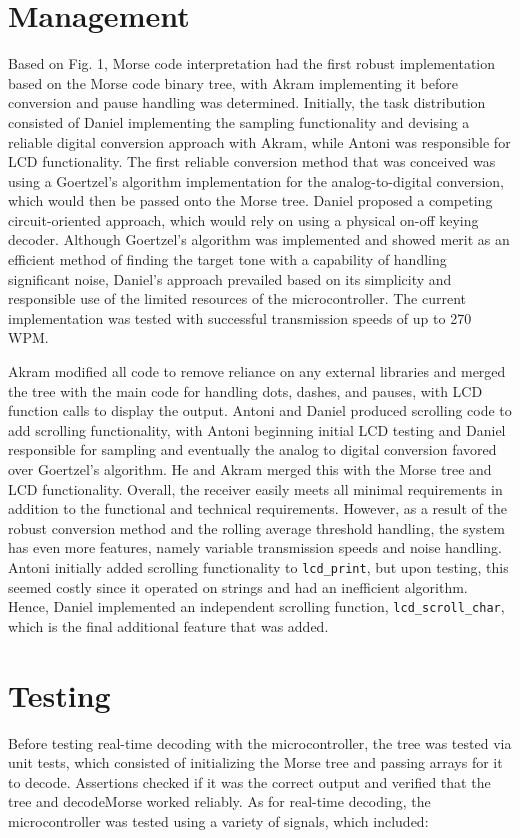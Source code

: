 \documentclass[head=13.6pt]{cce2014-design}
\begin{document}
\section{Management}
Based on Fig. 1, Morse code interpretation had the first robust implementation based on the Morse code binary tree, with Akram implementing it before conversion and pause handling was determined. Initially, the task distribution consisted of Daniel implementing the sampling functionality and devising a reliable digital conversion approach with Akram, while Antoni was responsible for LCD functionality. The first reliable conversion method that was conceived was using a Goertzel’s algorithm implementation for the analog-to-digital conversion, which would then be passed onto the Morse tree. Daniel proposed a competing circuit-oriented approach, which would rely on using a physical on-off keying decoder. Although Goertzel’s algorithm was implemented and showed merit as an efficient method of finding the target tone with a capability of handling significant noise, Daniel’s approach prevailed based on its simplicity and responsible use of the limited resources of the microcontroller. The current implementation was tested with successful transmission speeds of up to 270 WPM.

Akram modified all code to remove reliance on any external libraries and merged the tree with the main code for handling dots, dashes, and pauses, with LCD function calls to display the output. Antoni and Daniel produced scrolling code to add scrolling functionality, with Antoni beginning initial LCD testing and Daniel responsible for sampling and eventually the analog to digital conversion favored over Goertzel’s algorithm. He and Akram merged this with the Morse tree and LCD functionality. Overall, the receiver easily meets all minimal requirements in addition to the functional and technical requirements. However, as a result of the robust conversion method and the rolling average threshold handling, the system has even more features, namely variable transmission speeds and noise handling. Antoni initially added scrolling functionality to \texttt{lcd\_print}, but upon testing, this seemed costly since it operated on strings and had an inefficient algorithm. Hence, Daniel implemented an independent scrolling function, \texttt{lcd\_scroll\_char}, which is the final additional feature that was added.

\section{Testing}
Before testing real-time decoding with the microcontroller, the tree was tested via unit tests, which consisted of initializing the Morse tree and passing arrays for it to decode. Assertions checked if it was the correct output and verified that the tree and decodeMorse worked reliably. As for real-time decoding, the microcontroller was tested using a variety of signals, which included:
\end{document}
